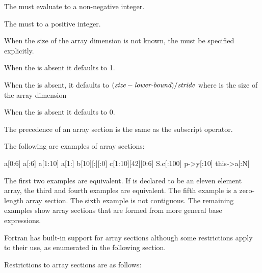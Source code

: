 \begin{ccppspecific}
The  must evaluate to a non-negative integer.

The  must to a positive integer.

When the size of the array dimension is not known, the  must 
be specified explicitly.

When the  is absent it defaults to 1.

When the  is absent, it defaults to 
$(\plc{size} - \plc{lower-bound})/\plc{stride}$ where  is
the size of the array dimension 

When the  is absent it defaults to 0.

The precedence of an array section is the same as the subscript operator.


\begin{note}
The following are examples of array sections:

\begin{indentedcodelist}
a[0:6]
a[:6]
a[1:10]
a[1:]
b[10][:][:0]
c[1:10][42][0:6]
S.c[:100]
p->y[:10]
this->a[:N]
\end{indentedcodelist}

The first two examples are equivalent. If  is declared to be an eleven
element array, the third and fourth examples are equivalent. The fifth example
is a zero-length array section. The sixth example is not contiguous.  The
remaining examples show array sections that are formed from more general base
expressions.
\end{note}
\medskip
\end{ccppspecific}

\begin{fortranspecific}
Fortran has built-in support for array sections although some
restrictions apply to their use, as enumerated in the following section.
\end{fortranspecific}

\restrictions
Restrictions to array sections are as follows:

